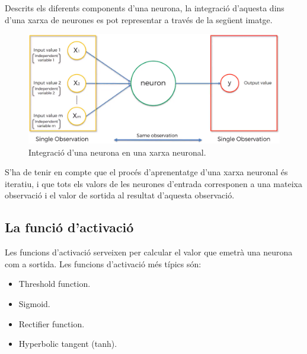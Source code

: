 \documentclass[12pt]{article}
\begin{document}
\\\\Descrits els diferents components d'una neurona, la integració d'aquesta dins d'una xarxa de neurones es pot representar a través de la següent imatge.
\begin{figure}[h!]
	\centering
	\includegraphics[scale=0.3]{imatges/neurona/8completa.png}
	\caption{Integració d'una neurona en una xarxa neuronal.}
\end{figure}
S'ha de tenir en compte que el procés d'aprenentatge d'una xarxa neuronal és iteratiu, i que tots els valors de les neurones d'entrada corresponen a una mateixa observació i el valor de sortida al resultat d'aquesta observació.



\clearpage
\subsection{La funció d'activació \label{fa}}
Les funcions d'activació serveixen per calcular el valor que emetrà una neurona com a sortida. Les funcions d'activació més típics són:
\begin{itemize}
	\item Threshold function.
	\item Sigmoid.
	\item Rectifier function.
	\item Hyperbolic tangent (tanh).
\end{itemize}
\end{document}
